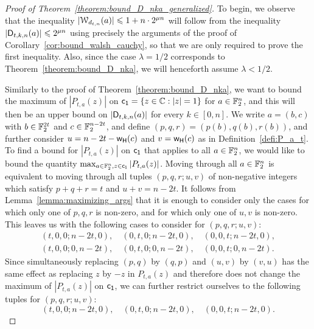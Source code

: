 \documentclass{llncs}
\begin{document}
\begin{proof}[Proof of Theorem~\ref{theorem:bound_D_nka_generalized}]
    To begin, we observe that the inequality $|\mathcal W_{d_{t,n}}(a)|\leqslant 1+n\cdot 2^{\mu n}$ will follow from the inequality $|\mathsf{D}_{t,k,n}(a)|\leqslant 2^{\mu n}$ using precisely the arguments of the proof of Corollary~\ref{cor:bound_walsh_cauchy}, so that we are only required to prove the first inequality. Also, since the case $\lambda=1/2$ corresponds to Theorem~\ref{theorem:bound_D_nka}, we will henceforth assume $\lambda<1/2$.
    
    Similarly to the proof of Theorem~\ref{theorem:bound_D_nka}, we want to bound the maximum of $|P_{t,a}(z)|$ on $\mathsf{c_1}=\{ z \in \mathbb{C}: |z|=1  \}$ for $a\in\mathbb{F}_2^n$, and this will then be an upper bound on $|\mathsf{D}_{t,k,n}(a)|$ for every $k\in[0,n]$. We write $a=(b,c)$ with $b\in\mathbb{F}_2^{2t}$ and $c\in\mathbb{F}_2^{n-2t}$, and define $(p,q,r)=(p(b),q(b),r(b))$, and further consider $u=n-2t-\mathsf{w_H}(c)$ and $v=\mathsf{w_H}(c)$ as in Definition~\ref{defi:P_a_t}. To find a bound for $|P_{t,a}(z)|$ on $\mathsf{c_1}$ that applies to all $a\in\mathbb{F}_2^n$, we would like to bound the quantity $\max_{a\in\mathbb{F}_2^n,z\in\mathsf{c_1}}|P_{t,a}(z)|$. Moving through all $a\in\mathbb{F}_2^n$ is equivalent to moving through all tuples $(p,q,r;u,v)$ of non-negative integers which satisfy $p+q+r=t$ and $u+v=n-2t$. It follows from Lemma~\ref{lemma:maximizing_args} that it is enough to consider only the cases for which only one of $p,q,r$ is non-zero, and for which only one of $u,v$ is non-zero. This leaves us with the following cases to consider for $(p,q,r;u,v)$:
    \begin{gather*}
        (t,0,0;n-2t,0),\quad(0,t,0;n-2t,0),\quad(0,0,t;n-2t,0),\\
        (t,0,0;0,n-2t),\quad(0,t,0;0,n-2t),\quad(0,0,t;0,n-2t).
    \end{gather*}
    Since simultaneously replacing $(p,q)$ by $(q,p)$ and $(u,v)$ by $(v,u)$ has the same effect as replacing $z$ by $-z$ in $P_{t,a}(z)$ and therefore does not change the maximum of $|P_{t,a}(z)|$ on $\mathsf{c_1}$, we can further restrict ourselves to the following tuples for $(p,q,r;u,v)$:
    \[
        (t,0,0;n-2t,0),\quad(0,t,0;n-2t,0),\quad(0,0,t;n-2t,0).
    \]


\end{proof}
\end{document}
